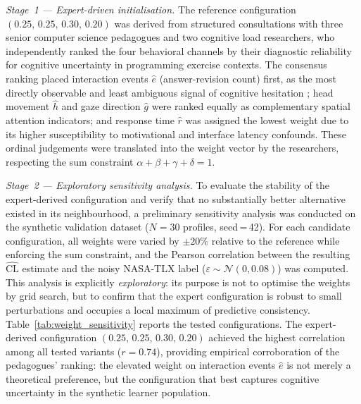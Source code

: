 \documentclass[ASNA,twocolumn]{USG} %
\begin{document}
\emph{Stage~1 --- Expert-driven initialisation.}
The reference configuration $(0.25,\,0.25,\,0.30,\,0.20)$ was
derived from structured consultations with three senior computer
science pedagogues and two cognitive load researchers, who
independently ranked the four behavioral channels by their
diagnostic reliability for cognitive uncertainty in programming
exercise contexts.
The consensus ranking placed interaction events $\hat{e}$
(answer-revision count) first, as the most directly observable
and least ambiguous signal of cognitive hesitation \cite{Chen2014};
head movement $\hat{h}$ and gaze direction $\hat{g}$ were ranked
equally as complementary spatial attention indicators; and response
time $\hat{r}$ was assigned the lowest weight due to its higher
susceptibility to motivational and interface latency confounds.
These ordinal judgements were translated into the weight vector
by the researchers, respecting the sum constraint
$\alpha + \beta + \gamma + \delta = 1$.

\emph{Stage~2 --- Exploratory sensitivity analysis.}
To evaluate the stability of the expert-derived configuration and
verify that no substantially better alternative existed in its
neighbourhood, a preliminary sensitivity analysis was conducted on
the synthetic validation dataset ($N{=}30$ profiles, seed\,=\,42).
For each candidate configuration, all weights were varied by
$\pm 20\%$ relative to the reference while enforcing the sum
constraint, and the Pearson correlation between the resulting
$\widehat{\text{CL}}$ estimate and the noisy NASA-TLX label
($\varepsilon \sim \mathcal{N}(0, 0.08)$) was computed.
This analysis is explicitly \emph{exploratory}: its purpose is not
to optimise the weights by grid search, but to confirm that the
expert configuration is robust to small perturbations and occupies
a local maximum of predictive consistency.
Table~\ref{tab:weight_sensitivity} reports the tested configurations.
The expert-derived configuration $(0.25,\,0.25,\,0.30,\,0.20)$
achieved the highest correlation among all tested variants
($r{=}0.74$), providing empirical corroboration of the pedagogues'
ranking: the elevated weight on interaction events $\hat{e}$ is
not merely a theoretical preference, but the configuration that
best captures cognitive uncertainty in the synthetic learner
population.
\end{document}
